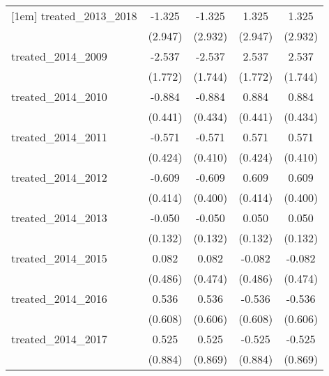 {\begin{tabular}{l*{4}{c}}
[1em]
treated\_2013\_2018&      -1.325         &      -1.325         &       1.325         &       1.325         \\
            &     (2.947)         &     (2.932)         &     (2.947)         &     (2.932)         \\
[1em]
treated\_2014\_2009&      -2.537         &      -2.537         &       2.537         &       2.537         \\
            &     (1.772)         &     (1.744)         &     (1.772)         &     (1.744)         \\
[1em]
treated\_2014\_2010&      -0.884\sym{*}  &      -0.884\sym{*}  &       0.884\sym{*}  &       0.884\sym{*}  \\
            &     (0.441)         &     (0.434)         &     (0.441)         &     (0.434)         \\
[1em]
treated\_2014\_2011&      -0.571         &      -0.571         &       0.571         &       0.571         \\
            &     (0.424)         &     (0.410)         &     (0.424)         &     (0.410)         \\
[1em]
treated\_2014\_2012&      -0.609         &      -0.609         &       0.609         &       0.609         \\
            &     (0.414)         &     (0.400)         &     (0.414)         &     (0.400)         \\
[1em]
treated\_2014\_2013&      -0.050         &      -0.050         &       0.050         &       0.050         \\
            &     (0.132)         &     (0.132)         &     (0.132)         &     (0.132)         \\
[1em]
treated\_2014\_2015&       0.082         &       0.082         &      -0.082         &      -0.082         \\
            &     (0.486)         &     (0.474)         &     (0.486)         &     (0.474)         \\
[1em]
treated\_2014\_2016&       0.536         &       0.536         &      -0.536         &      -0.536         \\
            &     (0.608)         &     (0.606)         &     (0.608)         &     (0.606)         \\
[1em]
treated\_2014\_2017&       0.525         &       0.525         &      -0.525         &      -0.525         \\
            &     (0.884)         &     (0.869)         &     (0.884)         &     (0.869)         \\

\end{tabular}}

